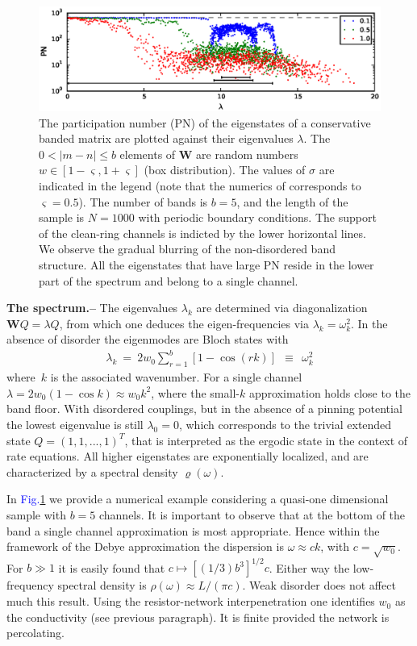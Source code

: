 \documentclass[twocolumn,showpacs,aps,pre]{revtex4-1}
\newcommand{\beq}{\begin{eqnarray}}
\newcommand{\eeq}{\end{eqnarray}}
\newcommand{\Fig}[1] {{\textcolor{blue}{Fig.}}\ref{#1}}
\newcommand{\sect}[1]{{\bf #1.-- }}
\begin{document}
\begin{figure}
\centering
\includegraphics[width=\hsize]{pthBanded}
 
\caption{The participation number (PN) \cite{rmrkA} of the eigenstates of a conservative banded matrix 
are plotted against their eigenvalues $\lambda$.
The $0< |m-n| \le b$ elements of $\bm{W}$ are random numbers $w\in[1-\varsigma,1+\varsigma]$ (box distribution).
The values of $\sigma$ are indicated in the legend  
(note that the numerics of \cite{BZFK13} corresponds to $\varsigma{=}0.5$). 
The number of bands is $b{=}5$, and the length of the sample is $N{=}1000$ with periodic boundary conditions. 
The support of the clean-ring channels is indicted by the lower horizontal lines.
We observe the gradual blurring of the non-disordered band structure. 
All the eigenstates that have large PN reside in the lower part of the spectrum and belong to a single channel. 
}

\label{f1}
\end{figure}



\sect{The spectrum}
%
The eigenvalues $\lambda_k$ are determined via diagonalization $\bm{W}Q=\lambda Q$, 
from which one deduces the eigen-frequencies via ${\lambda_k=\omega_k^2}$.
In the absence of disorder the eigenmodes are Bloch states with 
%
\beq
\lambda_k \ = \ 2w_0 \sum_{r=1}^{b}[1-\cos(r k)] \ \ \equiv \ \ \omega_k^2
\eeq  
%
where~$k$ is the associated wavenumber. 
For a single channel $\lambda=2w_0(1{-}\cos k) \approx w_0 k^2$, 
where the small-$k$ approximation holds close to the band floor.
%
With disordered couplings, but in the absence of a pinning potential 
the lowest eigenvalue is still $\lambda_0=0$,  
which corresponds to the trivial extended state ${Q=(1,1,...,1)}^T$, 
that is interpreted as the ergodic state in the context of rate equations. 
%
All higher eigenstates are exponentially localized, and are characterized 
by a spectral density $\varrho(\omega)$. 


In \Fig{f1} we provide a numerical example considering a quasi-one dimensional 
sample with ${b=5}$ channels.  
%
It is important to observe that at the bottom of the band 
a single channel approximation is most appropriate.
%
Hence within the framework of the Debye approximation 
the dispersion is $\omega \approx c k$, with ${c=\sqrt{w_0}}$. 
For $b{\gg1}$ it is easily found that $c\mapsto[(1/3)b^3]^{1/2}c$.
Either way the low-frequency spectral density 
is $\rho(\omega) \approx L/(\pi c)$.  
%
Weak disorder does not affect much this result. 
Using the resistor-network interpenetration 
one identifies $w_0$ as the conductivity (see previous paragraph). 
It is finite provided the network is percolating.  
\end{document}

